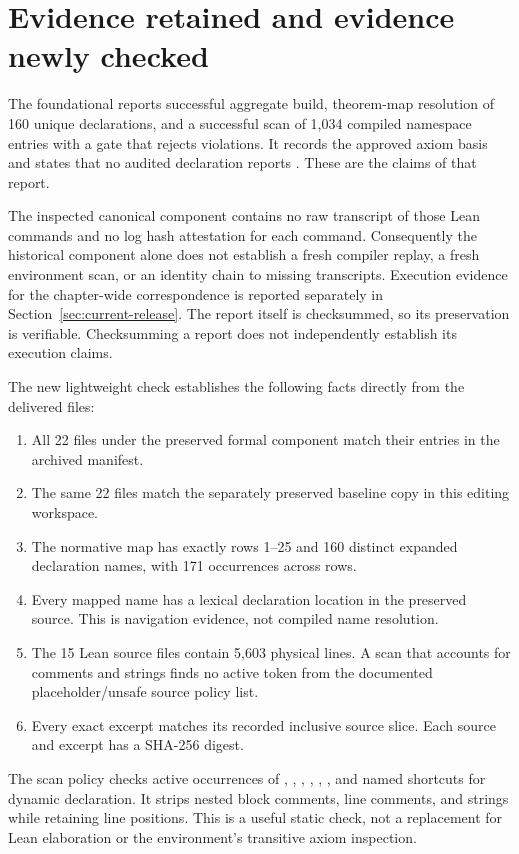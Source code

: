 \section{Evidence retained and evidence newly checked}\label{sec:evidence}

The foundational  reports successful aggregate build, theorem-map resolution of 160 unique declarations, and a successful scan of 1,034 compiled namespace entries with a gate that rejects violations. It records the approved axiom basis and states that no audited declaration reports . These are the claims of that report.

The inspected canonical component contains no raw transcript of those Lean commands and no log hash attestation for each command. Consequently the historical component alone does not establish a fresh compiler replay, a fresh environment scan, or an identity chain to missing transcripts. Execution evidence for the chapter-wide correspondence is reported separately in Section~\ref{sec:current-release}. The report itself is checksummed, so its preservation is verifiable. Checksumming a report does not independently establish its execution claims.

The new lightweight check establishes the following facts directly from the delivered files:
\begin{enumerate}
\item All 22 files under the preserved formal component match their entries in the archived  manifest.
\item The same 22 files match the separately preserved baseline copy in this editing workspace.
\item The normative map has exactly rows 1--25 and 160 distinct expanded declaration names, with 171 occurrences across rows.
\item Every mapped name has a lexical declaration location in the preserved source. This is navigation evidence, not compiled name resolution.
\item The 15 Lean source files contain 5,603 physical lines. A scan that accounts for comments and strings finds no active token from the documented placeholder/unsafe source policy list.
\item Every exact excerpt matches its recorded inclusive source slice. Each source and excerpt has a SHA-256 digest.
\end{enumerate}

The scan policy checks active occurrences of , , , , , , and named shortcuts for dynamic declaration. It strips nested block comments, line comments, and strings while retaining line positions. This is a useful static check, not a replacement for Lean elaboration or the environment's transitive axiom inspection.

